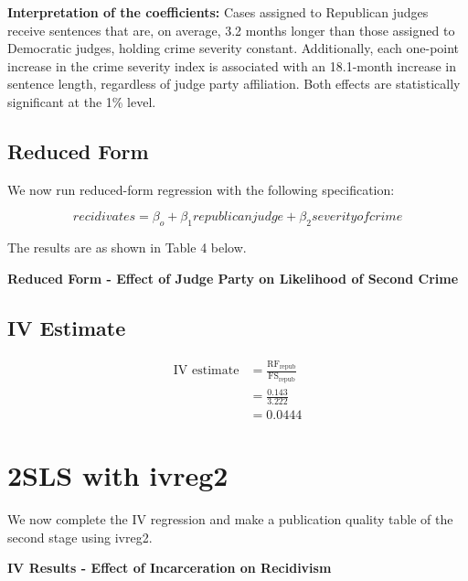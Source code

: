 \documentclass[12pt]{article}
\begin{document}
\textbf{Interpretation of the coefficients:} Cases assigned to Republican judges receive sentences that are, on average, 3.2 months longer than those assigned to Democratic judges, holding crime severity constant. Additionally, each one-point increase in the crime severity index is associated with an 18.1-month increase in sentence length, regardless of judge party affiliation. Both effects are statistically significant at the 1\% level.

\subsection{Reduced Form}

We now run reduced-form regression with the following specification:

$$ recidivates = \beta_o + \beta_1 republicanjudge + \beta_2 severityofcrime $$

The results are as shown in Table 4  below. 

\begin{table}[H]
    \begin{center} 
     \caption{\textbf{Reduced Form - Effect of Judge Party on Likelihood of Second Crime}}
    \label{tab:balance}
    
    \end{center}
\end{table}

\subsection{IV Estimate} 

\begin{align*}
\text{IV estimate} &= \frac{\text{RF}_{\text{repub}}}{\text{FS}_{\text{repub}}} \\
&= \frac{0.143}{3.222} \\
&= 0.0444
\end{align*}

\section{2SLS with ivreg2}

We now complete the IV regression and make a publication quality table of the second stage using ivreg2. 

\begin{table}[H]
    \begin{center} 
     \caption{\textbf{IV Results - Effect of Incarceration on Recidivism}}
    \label{tab:balance}
    
    \end{center}
\end{table}
\end{document}
